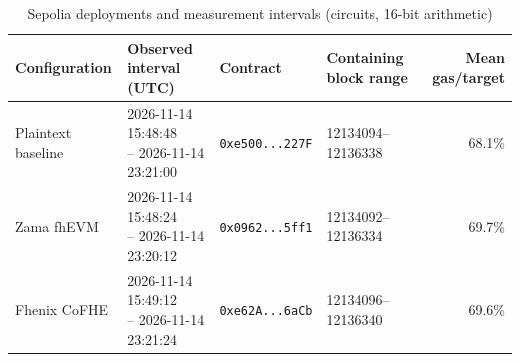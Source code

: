 \begin{table}[!t]
\caption{Sepolia deployments and measurement intervals (circuits, 16-bit arithmetic)}
\label{tab:sepolia-circuits-deployments}
\centering
\footnotesize
\setlength{\tabcolsep}{4pt}
\begin{tabular}{|l|l|l|l|r|}
\hline
\textbf{Configuration} & \textbf{Observed interval (UTC)} & \textbf{Contract} & \textbf{Containing block range} & \textbf{Mean gas/target} \\
\hline
Plaintext baseline & \shortstack[l]{2026-11-14 15:48:48 \\ -- 2026-11-14 23:21:00} & \texttt{0xe500...227F} & 12134094--12136338 & 68.1\% \\
\hline
Zama fhEVM & \shortstack[l]{2026-11-14 15:48:24 \\ -- 2026-11-14 23:20:12} & \texttt{0x0962...5ff1} & 12134092--12136334 & 69.7\% \\
\hline
Fhenix CoFHE & \shortstack[l]{2026-11-14 15:49:12 \\ -- 2026-11-14 23:21:24} & \texttt{0xe62A...6aCb} & 12134096--12136340 & 69.6\% \\
\hline
\end{tabular}
\end{table}
